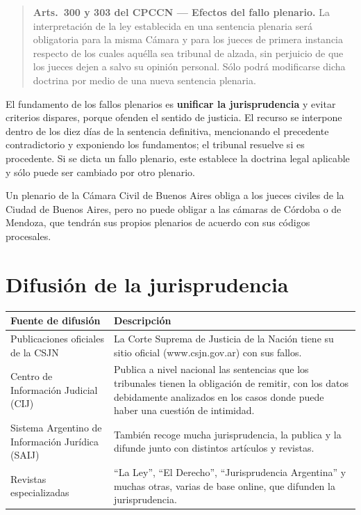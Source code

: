 \documentclass[12pt,oneside]{book}
\begin{document}
\begin{quote}
\textbf{Arts.~300 y 303 del CPCCN --- Efectos del fallo plenario.} La interpretación de la ley establecida en una sentencia plenaria será obligatoria para la misma Cámara y para los jueces de primera instancia respecto de los cuales aquélla sea tribunal de alzada, sin perjuicio de que los jueces dejen a salvo su opinión personal. Sólo podrá modificarse dicha doctrina por medio de una nueva sentencia plenaria.
\end{quote}

El fundamento de los fallos plenarios es \textbf{unificar la jurisprudencia} y evitar criterios dispares, porque ofenden el sentido de justicia. El recurso se interpone dentro de los diez días de la sentencia definitiva, mencionando el precedente contradictorio y exponiendo los fundamentos; el tribunal resuelve si es procedente. Si se dicta un fallo plenario, este establece la doctrina legal aplicable y sólo puede ser cambiado por otro plenario.

\begin{important}
Un plenario de la Cámara Civil de Buenos Aires obliga a los jueces civiles de la Ciudad de Buenos Aires, pero no puede obligar a las cámaras de Córdoba o de Mendoza, que tendrán sus propios plenarios de acuerdo con sus códigos procesales.
\end{important}

\section{Difusión de la jurisprudencia}

\begin{table}[H]
\centering
\begin{tabularx}{\textwidth}{>{\raggedright\arraybackslash}p{} >{\raggedright\arraybackslash}X}
\toprule
\textbf{Fuente de difusión} & \textbf{Descripción} \\
\midrule
Publicaciones oficiales de la CSJN & La Corte Suprema de Justicia de la Nación tiene su sitio oficial (www.csjn.gov.ar) con sus fallos. \\
\addlinespace
Centro de Información Judicial (CIJ) & Publica a nivel nacional las sentencias que los tribunales tienen la obligación de remitir, con los datos debidamente analizados en los casos donde puede haber una cuestión de intimidad. \\
\addlinespace
Sistema Argentino de Información Jurídica (SAIJ) & También recoge mucha jurisprudencia, la publica y la difunde junto con distintos artículos y revistas. \\
\addlinespace
Revistas especializadas & ``La Ley'', ``El Derecho'', ``Jurisprudencia Argentina'' y muchas otras, varias de base online, que difunden la jurisprudencia. \\
\bottomrule
\end{tabularx}
\end{table}
\end{document}
